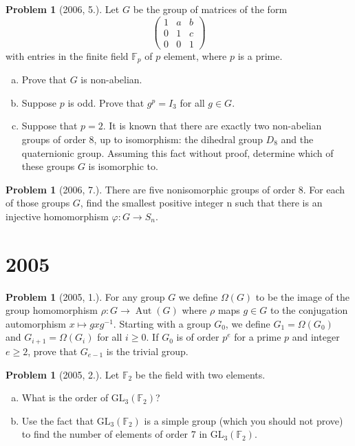 \documentclass{article}
\newcommand{\inv}{^{-1}}
\newcommand{\<}{\langle} %
\renewcommand{\>}{\rangle} %
\DeclareMathOperator{\Aut}{Aut}
\theoremstyle{plain}
\theoremstyle{remark}
\theoremstyle{definition}
\newtheorem{examproblem}[equation]{Problem}
\begin{document}
\begin{examproblem}[2006, 5.]
	Let $G$ be the group of matrices of the form
	$$
	\begin{pmatrix}
		1 & a & b\\
		0 & 1 & c\\
		0 & 0 & 1
	\end{pmatrix}
	$$
	with entries in the finite field $\mathbb F_p$ of $p$ element, where
	$p$ is a prime.
	\begin{enumerate}[(a)]
		\item Prove that $G$ is non-abelian.
		\item Suppose $p$ is odd. Prove that $g^p=I_3$ for all $g\in G$.
		\item Suppose that $p=2$. It is known that there are exactly
			two non-abelian groups of order 8, up to isomorphism:
			the dihedral group $D_8$ and the quaternionic group.
			Assuming this fact without proof, determine which
			of these groups $G$ is isomorphic to.
	\end{enumerate}
\end{examproblem}


\begin{examproblem}[2006, 7.]
	There are five nonisomorphic groups of order 8. For
	each of those groups $G$, find the smallest positive integer n such that there is an
	injective homomorphism $\varphi: G\rightarrow S_n$.
\end{examproblem}

\newpage

\section{2005}

\begin{examproblem}[2005, 1.]
	For any group $G$ we define $\Omega(G)$ to be the image of the group
	homomorphism $\rho:G\rightarrow\Aut(G)$ where $\rho$ maps
	$g\in G$ to the conjugation automorphism $x\mapsto gxg\inv$.
	Starting with a group $G_0$, we define $G_1=\Omega(G_0)$ and
	$G_{i+1}=\Omega(G_i)$ for all $i\geq 0$. If $G_0$ is of order
	$p^e$ for a prime $p$ and integer $e\geq 2$, prove that $G_{e-1}$
	is the trivial group.
\end{examproblem}

\begin{examproblem}[2005, 2.]
	Let $\mathbb F_2$ be the field with two elements.
	\begin{enumerate}[(a)]
		\item What is the order of $\text{GL}_3(\mathbb F_2)$?
		\item Use the fact that $\text{GL}_3(\mathbb F_2)$ is a simple group
			(which you should not prove) to find the number
			of elements of order 7 in $\text{GL}_3(\mathbb F_2)$.
	\end{enumerate}
\end{examproblem}
\end{document}
